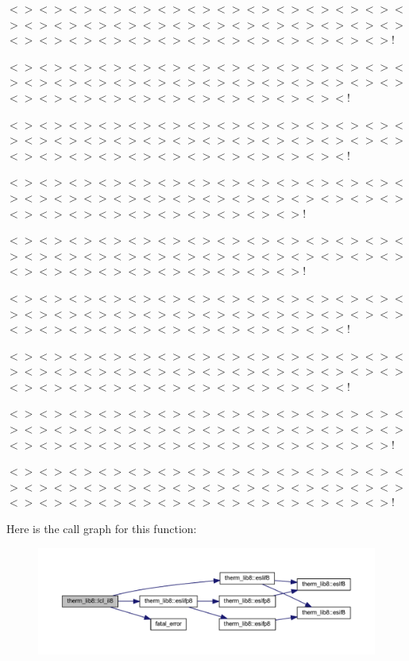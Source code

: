 $<$$>$$<$$>$$<$$>$$<$$>$$<$$>$$<$$>$$<$$>$$<$$>$$<$$>$$<$$>$$<$$>$$<$$>$$<$$>$$<$$>$$<$$>$$<$$>$$<$$>$$<$$>$$<$$>$$<$$>$$<$$>$$<$$>$$<$$>$$<$$>$$<$$>$$<$$>$$<$$>$$<$$>$$<$$>$$<$$>$$<$$>$$<$$>$$<$$>$$<$$>$$<$$>$$<$$>$$<$$>$$<$$>$$<$$>$$<$$>$!

$<$$>$$<$$>$$<$$>$$<$$>$$<$$>$$<$$>$$<$$>$$<$$>$$<$$>$$<$$>$$<$$>$$<$$>$$<$$>$$<$$>$$<$$>$$<$$>$$<$$>$$<$$>$$<$$>$$<$$>$$<$$>$$<$$>$$<$$>$$<$$>$$<$$>$$<$$>$$<$$>$$<$$>$$<$$>$$<$$>$$<$$>$$<$$>$$<$$>$$<$$>$$<$$>$$<$$>$$<$$>$$<$$>$$<$!

$<$$>$$<$$>$$<$$>$$<$$>$$<$$>$$<$$>$$<$$>$$<$$>$$<$$>$$<$$>$$<$$>$$<$$>$$<$$>$$<$$>$$<$$>$$<$$>$$<$$>$$<$$>$$<$$>$$<$$>$$<$$>$$<$$>$$<$$>$$<$$>$$<$$>$$<$$>$$<$$>$$<$$>$$<$$>$$<$$>$$<$$>$$<$$>$$<$$>$$<$$>$$<$$>$$<$$>$$<$$>$$<$$>$$<$!

$<$$>$$<$$>$$<$$>$$<$$>$$<$$>$$<$$>$$<$$>$$<$$>$$<$$>$$<$$>$$<$$>$$<$$>$$<$$>$$<$$>$$<$$>$$<$$>$$<$$>$$<$$>$$<$$>$$<$$>$$<$$>$$<$$>$$<$$>$$<$$>$$<$$>$$<$$>$$<$$>$$<$$>$$<$$>$$<$$>$$<$$>$$<$$>$$<$$>$$<$$>$$<$$>$$<$$>$$<$$>$!

$<$$>$$<$$>$$<$$>$$<$$>$$<$$>$$<$$>$$<$$>$$<$$>$$<$$>$$<$$>$$<$$>$$<$$>$$<$$>$$<$$>$$<$$>$$<$$>$$<$$>$$<$$>$$<$$>$$<$$>$$<$$>$$<$$>$$<$$>$$<$$>$$<$$>$$<$$>$$<$$>$$<$$>$$<$$>$$<$$>$$<$$>$$<$$>$$<$$>$$<$$>$$<$$>$$<$$>$$<$$>$!

$<$$>$$<$$>$$<$$>$$<$$>$$<$$>$$<$$>$$<$$>$$<$$>$$<$$>$$<$$>$$<$$>$$<$$>$$<$$>$$<$$>$$<$$>$$<$$>$$<$$>$$<$$>$$<$$>$$<$$>$$<$$>$$<$$>$$<$$>$$<$$>$$<$$>$$<$$>$$<$$>$$<$$>$$<$$>$$<$$>$$<$$>$$<$$>$$<$$>$$<$$>$$<$$>$$<$$>$$<$$>$$<$$>$$<$!

$<$$>$$<$$>$$<$$>$$<$$>$$<$$>$$<$$>$$<$$>$$<$$>$$<$$>$$<$$>$$<$$>$$<$$>$$<$$>$$<$$>$$<$$>$$<$$>$$<$$>$$<$$>$$<$$>$$<$$>$$<$$>$$<$$>$$<$$>$$<$$>$$<$$>$$<$$>$$<$$>$$<$$>$$<$$>$$<$$>$$<$$>$$<$$>$$<$$>$$<$$>$$<$$>$$<$$>$$<$$>$$<$$>$$<$!

$<$$>$$<$$>$$<$$>$$<$$>$$<$$>$$<$$>$$<$$>$$<$$>$$<$$>$$<$$>$$<$$>$$<$$>$$<$$>$$<$$>$$<$$>$$<$$>$$<$$>$$<$$>$$<$$>$$<$$>$$<$$>$$<$$>$$<$$>$$<$$>$$<$$>$$<$$>$$<$$>$$<$$>$$<$$>$$<$$>$$<$$>$$<$$>$$<$$>$$<$$>$$<$$>$$<$$>$$<$$>$$<$$>$$<$$>$$<$$>$!

$<$$>$$<$$>$$<$$>$$<$$>$$<$$>$$<$$>$$<$$>$$<$$>$$<$$>$$<$$>$$<$$>$$<$$>$$<$$>$$<$$>$$<$$>$$<$$>$$<$$>$$<$$>$$<$$>$$<$$>$$<$$>$$<$$>$$<$$>$$<$$>$$<$$>$$<$$>$$<$$>$$<$$>$$<$$>$$<$$>$$<$$>$$<$$>$$<$$>$$<$$>$$<$$>$$<$$>$$<$$>$$<$$>$$<$$>$$<$$>$! 

Here is the call graph for this function\+:\nopagebreak
\begin{figure}[H]
\begin{center}
\leavevmode
\includegraphics[width=350pt]{namespacetherm__lib8_a0f6906696662a832ed73b03f8f97e449_cgraph}
\end{center}
\end{figure}




